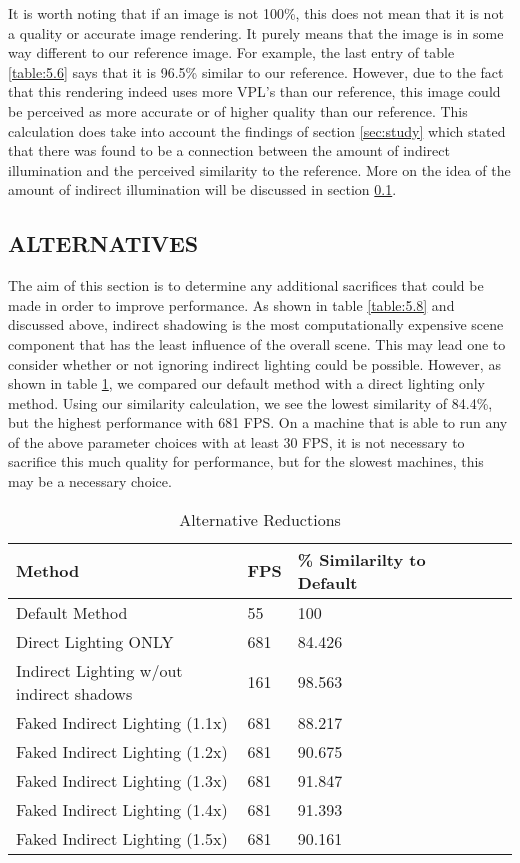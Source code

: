 It is worth noting that if an image is not 100\%, this does not mean that it is not a quality or accurate image rendering.  It purely means that the image is in some way different to our reference image.  For example, the last entry of table \ref{table:5.6} says that it is 96.5\% similar to our reference.  However, due to the fact that this rendering indeed uses more VPL's than our reference, this image could be perceived as more accurate or of higher quality than our reference.  This calculation does take into account the findings of section \ref{sec:study} which stated that there was found to be a connection between the amount of indirect illumination and the perceived similarity to the reference.  More on the idea of the amount of indirect illumination will be discussed in section \ref{sec:alternatives}.

\subsection{ALTERNATIVES} \label{sec:alternatives}
The aim of this section is to determine any additional sacrifices that could be made in order to improve performance.  As shown in table \ref{table:5.8} and discussed above, indirect shadowing is the most computationally expensive scene component that has the least influence of the overall scene.  This may lead one to consider whether or not ignoring indirect lighting could be possible.  However, as shown in table \ref{table:5.9}, we compared our default method with a direct lighting only method.  Using our similarity calculation, we see the lowest similarity of 84.4\%, but the highest performance with 681 FPS.  On a machine that is able to run any of the above parameter choices with at least 30 FPS, it is not necessary to sacrifice this much quality for performance, but for the slowest machines, this may be a necessary choice.

\begin{table}[h!]
	\caption{Alternative Reductions}
	\begin{center}
	    \begin{tabular}{ | l | l | l | l | l | l |}
	    \hline
	    Method & FPS & \% Similarilty to Default\\ \hline
	    Default Method & 55 & 100\\ \hline
	    Direct Lighting ONLY & 681 & 84.426\\ \hline
	    Indirect Lighting w/out indirect shadows & 161 & 98.563\\ \hline
	    Faked Indirect Lighting (1.1x) & 681 & 88.217\\ \hline
	    Faked Indirect Lighting (1.2x) & 681 & 90.675\\ \hline
	    Faked Indirect Lighting (1.3x) & 681 & 91.847\\ \hline
	    Faked Indirect Lighting (1.4x) & 681 & 91.393\\ \hline
	    Faked Indirect Lighting (1.5x) & 681 & 90.161\\ \hline
	    \end{tabular}
	\end{center}
	\label{table:5.9}
\end{table}

